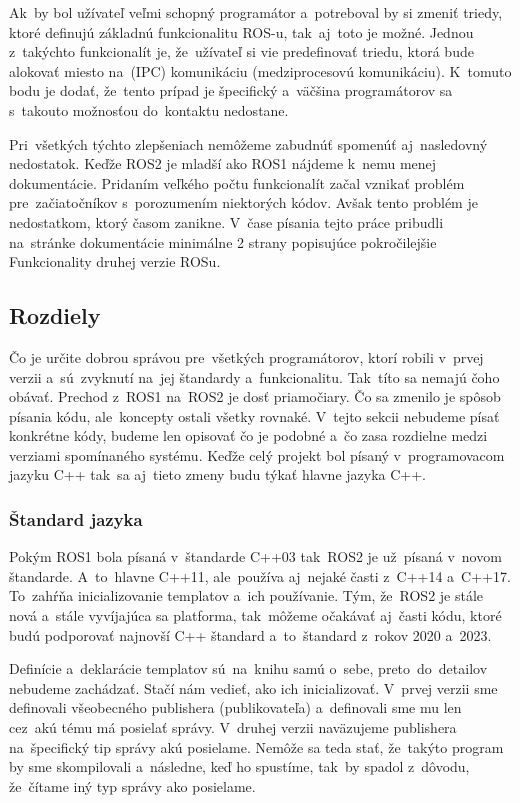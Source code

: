 Ak~by bol užívateľ veľmi schopný programátor a~potreboval by si zmeniť triedy, ktoré definujú základnú funkcionalitu ROS-u, tak~aj~toto je možné.
Jednou z~takýchto funkcionalít je, že~užívateľ si vie predefinovať triedu, ktorá bude alokovať miesto na~(IPC) komunikáciu (medziprocesovú komunikáciu).
K~tomuto bodu je dodať, že~tento prípad je špecifický a~väčšina programátorov sa s~takouto možnosťou do~kontaktu nedostane.

Pri~všetkých týchto zlepšeniach nemôžeme zabudnúť spomenúť aj~nasledovný nedostatok. Keďže ROS2 je mladší ako ROS1 nájdeme k~nemu menej dokumentácie.
Pridaním veľkého počtu funkcionalít začal vznikať problém pre~začiatočníkov s~porozumením niektorých kódov. Avšak tento problém je nedostatkom,
ktorý časom zanikne. V~čase písania tejto práce pribudli na~stránke dokumentácie minimálne 2 strany popisujúce pokročilejšie Funkcionality druhej
verzie ROSu.

\subsection{Rozdiely}

Čo je určite dobrou správou pre~všetkých programátorov, ktorí robili v~prvej verzii a~sú~zvyknutí na~jej štandardy a~funkcionalitu. Tak~títo
sa nemajú čoho obávať. Prechod z~ROS1 na~ROS2 je dosť priamočiary. Čo sa zmenilo je spôsob písania kódu, ale~koncepty ostali všetky rovnaké.
V~tejto sekcii nebudeme písať konkrétne kódy, budeme len opisovať čo je podobné a~čo zasa rozdielne medzi verziami spomínaného systému. Keďže
celý projekt bol písaný v~programovacom jazyku C++ tak~sa aj~tieto zmeny budu týkať hlavne jazyka C++.

\subsubsection{Štandard jazyka}

	Pokým ROS1 bola písaná v~štandarde C++03 tak~ROS2 je už~písaná v~novom štandarde. A~to~hlavne C++11, ale~používa aj~nejaké časti z~C++14
	a~C++17. To~zahŕňa inicializovanie templatov a~ich používanie. Tým, že~ROS2 je stále nová a~stále vyvíjajúca sa platforma, tak~môžeme očakávať aj~časti
	kódu, ktoré budú podporovať najnovší C++ štandard a~to~štandard z~rokov 2020 a~2023.

	Definície a~deklarácie templatov sú~na~knihu samú o~sebe, preto~do~detailov nebudeme zachádzať. Stačí nám vedieť, ako ich inicializovať.
	V~prvej verzii sme definovali všeobecného publishera (publikovateľa) a~definovali sme mu len cez~akú tému má posielať správy. V~druhej verzii
	naväzujeme publishera na~špecifický tip správy akú posielame. Nemôže sa teda stať, že~takýto program by sme skompilovali a~následne, keď
	ho spustíme, tak~by spadol z~dôvodu, že~čítame iný typ správy ako posielame.

